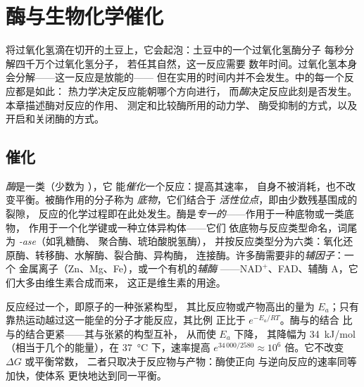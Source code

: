\chapter{酶与生物化学催化}\label{ch:b1:enzymes}

将过氧化氢滴在切开的土豆上，它会起泡：土豆中的一个过氧化氢酶分子
每秒分解四千万个过氧化氢分子，
若任其自然，这一反应需要
数年时间。过氧化氢本身会分解——这一反应是放能的——
但在实用的时间内并不会发生。中的每一个反应都是如此：
热力学决定反应能朝哪个方向进行，
而\emph{酶}决定反应此刻是否发生。本章描述酶对反应的作用、
测定和比较酶所用的动力学、
酶受抑制的方式，以及
开启和关闭酶的方式。

\section{催化}

\begin{definition}[酶、底物与活性位点]\label{def:b1:enzymes:enzyme}
\emph{酶}是一类（少数为 ），它
能\emph{催化}一个反应：提高其速率，
自身不被消耗，也不改变平衡。被酶作用的分子称为
\emph{底物}，它们结合于
\emph{活性位点}，即由少数残基围成的裂隙，
反应的化学过程即在此处发生。酶是\emph{专一的}——作用于一种底物或一类底物，
作用于一个化学键或一种立体异构体——它们
依底物与反应类型命名，词尾为
\emph{-ase}（如乳糖酶、 聚合酶、琥珀酸脱氢酶），
并按反应类型分为六类：氧化还原酶、转移酶、水解酶、裂合酶、异构酶，
连接酶。许多酶需要非的\emph{辅因子}：一个
金属离子（Zn、Mg、Fe），或一个有机的\emph{辅酶}
——$\mathrm{NAD^+}$、FAD、辅酶 A，它们大多由维生素合成而来，
这正是维生素的用途。
\end{definition}

\begin{proposition}\label{prop:b1:enzymes:whatitdoes}
反应经过一个\emph{}，即原子的一种张紧构型，
其比反应物或产物高出的量为
\emph{} $E_a$；只有
靠热运动越过这一能垒的分子才能反应，其比例
正比于 $e^{-E_a/RT}$。酶与的结合
比与的结合更紧——其与张紧的构型互补，
从而使 $E_a$ 下降，
其降幅为 \qty{34}{kJ/mol}（相当于几个的能量），在
\qty{37}{\celsius} 下，速率提高 $e^{34\,000/2580} \approx
10^6$ 倍。它不改变 $\Delta G$ 或平衡常数，
二者只取决于反应物与产物：酶使正向
与逆向反应的速率同等加快，使体系
更快地达到同一平衡。
\end{proposition}

